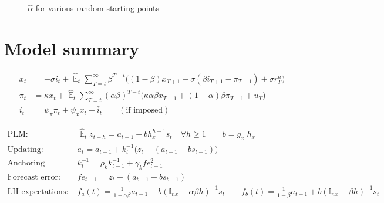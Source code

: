 \documentclass[11pt]{article}
\def \myFigPath {../../figures/}
\renewcommand{\[}{\begin{equation}}
\renewcommand{\]}{\end{equation}}
\DeclareMathOperator{\E}{\mathbb{E}}
\def\myTinyFigScale{0.16}
\begin{document}
\begin{figure}[h!]
\hfill
{}
\caption{$\hat{\alpha}$ for various random starting points}
\end{figure}


    \clearpage
\appendix
\section{Model summary}

\vspace{-0.5cm}

\begin{align}
x_t &=  -\sigma i_t +\hat{\E}_t \sum_{T=t}^{\infty} \beta^{T-t }\big( (1-\beta)x_{T+1} - \sigma(\beta i_{T+1} - \pi_{T+1}) +\sigma r_T^n \big)  \label{A1}  \\
\pi_t &= \kappa x_t +\hat{\E}_t \sum_{T=t}^{\infty} (\alpha\beta)^{T-t }\big( \kappa \alpha \beta x_{T+1} + (1-\alpha)\beta \pi_{T+1} + u_T\big) \label{A2}  \\
i_t &= \psi_{\pi}\pi_t + \psi_{x} x_t  + \bar{i}_t \label{TR} \quad \quad (\text{if imposed})
\end{align}

\vspace{-1.2cm}

\begin{align}
\text{PLM:} \quad \quad & \hat{\E}_t z_{t+h}  =  a_{t-1} + bh_x^{h-1}s_t  \quad \forall h\geq 1 \quad \quad b = g_x\; h_x \quad \quad  \label{PLM} \\
\text{Updating:} \quad \quad & a_{t}  =a_{t-1} +k_t^{-1}\big(z_{t} -(a_{t-1}+b s_{t-1}) \big)  \label{A5} \\
\text{Anchoring function:} \quad \quad & k^{-1}_t  = \rho_k k^{-1}_{t-1} + \gamma_k fe_{t-1}^2 \label{A6}\\
\text{Forecast error:} \quad \quad & fe_{t-1}  = z_t - (a_{t-1}+b s_{t-1}) \label{A7} \\
\text{LH expectations:} \quad \quad & f_a(t) = \frac{1}{1-\alpha\beta}a_{t-1}  + b(\mathbb{I}_{nx} - \alpha\beta h)^{-1}s_t \quad \quad  f_b(t) = \frac{1}{1-\beta}a_{t-1}  + b(\mathbb{I}_{nx} - \beta h)^{-1}s_t  \label{A8}
\end{align}
\end{document}
